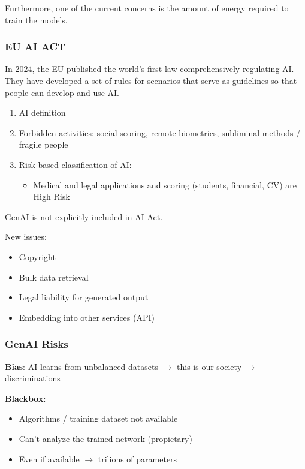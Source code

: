 \documentclass[11pt]{article}
\begin{document}
    Furthermore, one of the current concerns is the amount of energy required to train the models.

    \subsubsection{EU AI ACT}
        In 2024, the EU published the world's first law comprehensively regulating AI. They have developed a set of rules for scenarios that serve as guidelines so that people can develop and use AI.

        \begin{enumerate}
            \item AI definition
            \item Forbidden activities: social scoring, remote biometrics, subliminal methods / fragile people
            \item Risk based classification of AI:
                \begin{itemize}
                    \item Medical and legal applications and scoring (students, financial, CV) are High Risk
                \end{itemize}
        \end{enumerate}

        GenAI is not explicitly included in AI Act.
        
        New issues:
        \begin{itemize}
            \item Copyright
            \item Bulk data retrieval
            \item Legal liability for generated output
            \item Embedding into other services (API)
        \end{itemize}

    \subsubsection{GenAI Risks}
        \textbf{Bias}: AI learns from unbalanced datasets $\rightarrow$ this is our society $\rightarrow$ discriminations

        \textbf{Blackbox}:
        \begin{itemize}
            \item Algorithms / training dataset not available
            \item Can't analyze the trained network (propietary)
            \item Even if available $\rightarrow$ trilions of parameters
        \end{itemize}
\end{document}
